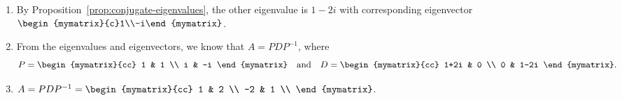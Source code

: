 \begin{enumialphparenastyle}
\begin{ex}
  \begin{sol}
    \begin{enumerate}
    \item By Proposition~\ref{prop:conjugate-eigenvalues}, the other
      eigenvalue is $1-2i$ with corresponding eigenvector
      $\begin{mymatrix}{c}1\\-i\end{mymatrix}$.
    \item From the eigenvalues and eigenvectors, we know that
      $A=PDP^{-1}$, where
      \begin{equation*}
        P = \begin{mymatrix}{cc}
          1 & 1 \\
          i & -i
        \end{mymatrix}
        \quad\mbox{and}\quad
        D = \begin{mymatrix}{cc}
          1+2i & 0 \\
          0 & 1-2i
        \end{mymatrix}.
      \end{equation*}
    \item $A = PDP^{-1} = \begin{mymatrix}{cc}
        1 & 2 \\
        -2 & 1 \\
      \end{mymatrix}$.
    \end{enumerate}
  \end{sol}
\end{ex}

\end{enumialphparenastyle}
